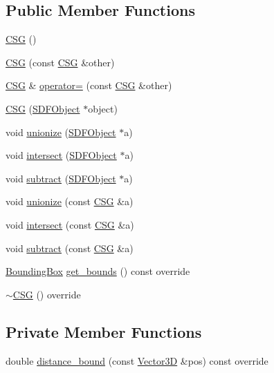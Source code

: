 \subsection*{Public Member Functions}
\begin{DoxyCompactItemize}
\item 
\mbox{\hyperlink{classCSG_a09bbc9336539ecf40021a9b3ec224afd}{C\+SG}} ()
\item 
\mbox{\hyperlink{classCSG_a9214110752f4bfead01357b5f1f7522e}{C\+SG}} (const \mbox{\hyperlink{classCSG}{C\+SG}} \&other)
\item 
\mbox{\hyperlink{classCSG}{C\+SG}} \& \mbox{\hyperlink{classCSG_a2fed963769aedb056d3f214bfe1413be}{operator=}} (const \mbox{\hyperlink{classCSG}{C\+SG}} \&other)
\item 
\mbox{\hyperlink{classCSG_a93e83c940758238fc7b188555b5a3787}{C\+SG}} (\mbox{\hyperlink{classSDFObject}{S\+D\+F\+Object}} $\ast$object)
\item 
void \mbox{\hyperlink{classCSG_a5b18efa47eb13a12633d0f5b5c1df165}{unionize}} (\mbox{\hyperlink{classSDFObject}{S\+D\+F\+Object}} $\ast$a)
\item 
void \mbox{\hyperlink{classCSG_ac44266e75a0b36097cca17e267df9873}{intersect}} (\mbox{\hyperlink{classSDFObject}{S\+D\+F\+Object}} $\ast$a)
\item 
void \mbox{\hyperlink{classCSG_a2f7550a90e950e8b143e4556b03a2a32}{subtract}} (\mbox{\hyperlink{classSDFObject}{S\+D\+F\+Object}} $\ast$a)
\item 
void \mbox{\hyperlink{classCSG_aed60985ee9a6fa106a48da72bc14582d}{unionize}} (const \mbox{\hyperlink{classCSG}{C\+SG}} \&a)
\item 
void \mbox{\hyperlink{classCSG_a1a3764a10ea7681673844ed106681569}{intersect}} (const \mbox{\hyperlink{classCSG}{C\+SG}} \&a)
\item 
void \mbox{\hyperlink{classCSG_a34a2197ec5dca9d43f88cfacbffdda53}{subtract}} (const \mbox{\hyperlink{classCSG}{C\+SG}} \&a)
\item 
\mbox{\hyperlink{classBoundingBox}{Bounding\+Box}} \mbox{\hyperlink{classCSG_abf2daf252f0b53f094ee5336eafb57ac}{get\+\_\+bounds}} () const override
\item 
\mbox{\hyperlink{classCSG_a37f03d2821dec9ee614ec6407758ba17}{$\sim$\+C\+SG}} () override
\end{DoxyCompactItemize}
\subsection*{Private Member Functions}
\begin{DoxyCompactItemize}
\item 
double \mbox{\hyperlink{classCSG_a7dc0853ae99ffd54ea99eccdc5fd5acf}{distance\+\_\+bound}} (const \mbox{\hyperlink{classVector3D}{Vector3D}} \&pos) const override
\end{DoxyCompactItemize}
